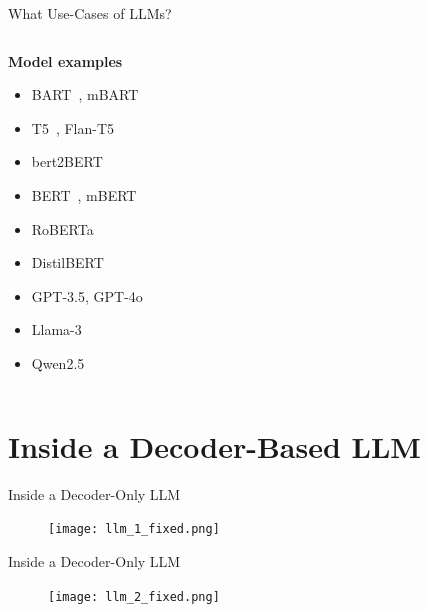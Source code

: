 \documentclass[11pt,aspectratio=169]{beamer}
\begin{document}
\begin{frame}{What Use-Cases of LLMs?}
\begin{columns}
        \begin{column}{0.3\linewidth}
            \begin{center}
            \textbf{Model examples}
            \end{center}
            \begin{itemize}
                \item BART~\cite{bart}, mBART~\cite{mbart}
                \item T5~\cite{t5}, Flan-T5~\cite{flan-t5}
                \item bert2BERT~\cite{bert2bert}
            \end{itemize}
            \vspace{0.3cm}
            \begin{itemize}
                \item BERT~\cite{bert}, mBERT~\cite{mbert}
                \item RoBERTa~\cite{roberta}
                \item DistilBERT~\cite{distilbert}
            \end{itemize}
            \vspace{0.3cm}
            \begin{itemize}
                \item GPT-3.5, GPT-4o
                \item Llama-3~\cite{llama3}
                \item Qwen2.5~\cite{qwen25technicalreport}
            \end{itemize}
        \end{column}
    \end{columns}
\end{frame}

\section{Inside a Decoder-Based LLM}

\begin{frame}{Inside a Decoder-Only LLM}
    \begin{figure}
        \centering
        \texttt{[image: llm\_1\_fixed.png]}
    \end{figure}
\end{frame}

\begin{frame}{Inside a Decoder-Only LLM}
    \begin{figure}
        \centering
        \texttt{[image: llm\_2\_fixed.png]}
    \end{figure}
\end{frame}
\end{document}
